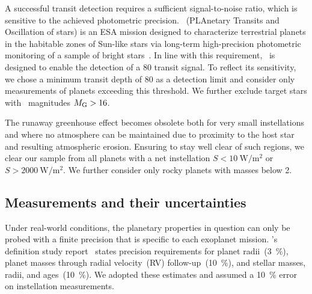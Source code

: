 \documentclass[twocolumn,twocolappendix,linenumbers]{aastex631}
\begin{document}
A successful transit detection requires a sufficient signal-to-noise ratio, which is sensitive to the achieved photometric precision. %
\plato\ (PLAnetary Transits and Oscillation of stars) is an ESA mission designed to characterize terrestrial planets in the habitable zones of Sun-like stars via long-term high-precision photometric monitoring of a sample of bright stars~\citep{Rauer2016}.
In line with this requirement, \plato\ is designed to enable the detection of a \SI{80}{\ppm} transit signal.
To reflect its sensitivity, we chose a minimum transit depth of \SI{80}{\ppm} as a detection limit and consider only measurements of planets exceeding this threshold.
We further exclude target stars with \gaia\ magnitudes $M_\mathrm{G} > 16$.

The runaway greenhouse effect becomes obsolete both for very small instellations and where no atmosphere can be maintained due to proximity to the host star and resulting atmospheric erosion.
Ensuring to stay well clear of such regions, we clear our sample from all planets with a net instellation $S < \SI{10}{\watt\per\square\meter}$ or $S > \SI{2000}{\watt\per\square\meter}$.
We further consider only rocky planets with masses below \SI{2}{\Mearth}. %

\subsection{Measurements and their uncertainties}
Under real-world conditions, the planetary properties in question can only be probed with a finite precision that is specific to each exoplanet mission.
\plato's definition study report~\citep{plato2017} states precision requirements for planet radii~(\SI{3}{\percent}), planet masses through radial velocity~(RV) follow-up~(\SI{10}{\percent}), and stellar masses, radii, and ages~(\SI{10}{\percent}).
We adopted these estimates and assumed a \SI{10}{\percent} error on instellation measurements.
\end{document}
